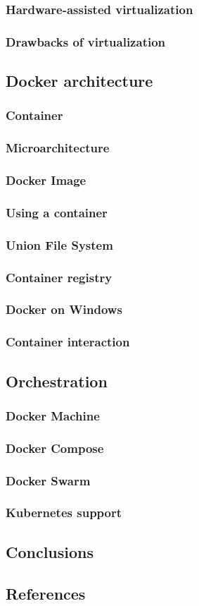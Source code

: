 \subsubsection{Hardware-assisted virtualization}
\subsubsection{Drawbacks of virtualization}
\subsection{Docker architecture}
\subsubsection{Container}
\subsubsection{Microarchitecture}
\subsubsection{Docker Image}
\subsubsection{Using a container}
\subsubsection{Union File System}
\subsubsection{Container registry}
\subsubsection{Docker on Windows}
\subsubsection{Container interaction}
\subsection{Orchestration}
\subsubsection{Docker Machine}
\subsubsection{Docker Compose}
\subsubsection{Docker Swarm}
\subsubsection{Kubernetes support}
\subsection{Conclusions}
\subsection{References}
